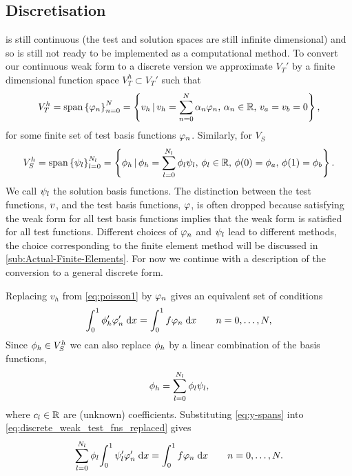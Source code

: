 \subsection{Discretisation}

 is still continuous (\ie the test and solution spaces are still infinite dimensional) and so is still not ready to be implemented as a computational method.
To convert our continuous weak form to a discrete version we approximate $V_{T}'$ by a finite dimensional function space $V_{T}^{h}\subset V_{T}'$ such that
\begin{equation}
  V_{T}^{h}=\text{span} \left\{ { \varphi_{n} } \right\}_{n=0}^{N}
  = \left\{ {v_h \,|\, v_h = \sum_{n=0}^{N}\alpha_{n} \varphi_{n},\, \alpha_{n} \in \mathbb{R},\,
    v_a = v_b =0 } \right\},
  \label{eq:30}
\end{equation}
for some finite set of test basis functions $\varphi_{n}$.
Similarly, for $V_S$
\begin{equation}
  \label{eq:34}
  V_{S}^{h}=\text{span} \left\{ { \psi_{l} } \right\}_{l=0}^{N_l}
  = \left\{ {\phi_h \,|\, \phi_h = \sum_{l=0}^{N_l}\phi_{l} \psi_{l},\, \phi_{l} \in \mathbb{R},\,
    \phi(0) = \phi_a,\, \phi(1) = \phi_b } \right\}.
\end{equation}
We call $\psi_l$ the solution basis functions.
The distinction between the test functions, $v$, and the test basis functions, $\varphi$, is often dropped because satisfying the weak form for all test basis functions implies that the weak form is satisfied for all test functions.
Different choices of $\varphi_{n}$ and $\psi_l$ lead to different methods, the choice corresponding to the finite element method will be discussed in \cref{sub:Actual-Finite-Elements}.
For now we continue with a description of the conversion to a general discrete form.

Replacing $v_{h}$ from \cref{eq:poisson1} by $\varphi_{n}$ gives an equivalent set of conditions
\begin{equation}
  {\int_0^1   \phi'_{h} \varphi_{n}'   {\; \mathrm{{d}}}{x}}  = {\int_0^1  f\varphi_{n}  {\; \mathrm{{d}}}{x}} \qquad n=0,\ldots,N,
  \label{eq:discrete_weak_test_fns_replaced}
\end{equation}
Since $\phi_{h}\in V_{S}^{h}$ we can also replace $\phi_{h}$ by a linear combination of the basis functions, \ie
\begin{equation}
  \phi_{h}=\sum_{l=0}^{N_l} \phi_{l}\psi_{l},
  \label{eq:y-spans}
\end{equation}
where $c_l \in \mathbb{R}$ are (unknown) coefficients.
Substituting \cref{eq:y-spans} into \cref{eq:discrete_weak_test_fns_replaced} gives
\begin{equation}
  \sum_{l=0}^{N_l} \phi_{l}{\int_0^1  \psi_{l}'\varphi'_{n}  {\; \mathrm{{d}}}{x}} ={\int_0^1  f\varphi_{n}  {\; \mathrm{{d}}}{x}} 
  \qquad n=0,\ldots,N.
  \label{eq:31}
\end{equation}

